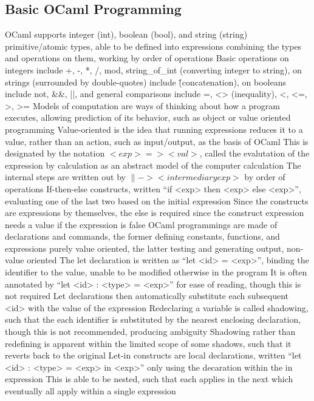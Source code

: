 \documentclass[11 pt, twoside]{article}
\newenvironment{outline*}
{
	\begin{outline}[enumerate]
	}
	{\end{outline}
}
\begin{document}
\subsection{Basic OCaml Programming}
\begin{outline*}
\1 OCaml supports integer (int), boolean (bool), and string (string) primitive/atomic types, able to be defined into expressions combining the types and operations on them, working by order of operations
\2 Basic operations on integers include +, -, *, /, mod, string\_of\_int (converting integer to string), on strings (surrounded by double-quotes) include \^ (concatenation), on booleans include not, \&\&, ||, and general comparisons include =, <> (inequality), <, <=, >, >=
\1 Models of computation are ways of thinking about how a program executes, allowing prediction of its behavior, such as object or value oriented programming
\2 Value-oriented is the idea that running expressions reduces it to a value, rather than an action, such as input/output, as the basis of OCaml
\2 This is designated by the notation $<exp> => <val>$, called the evalutation of the expression by calculation as an abstract model of the computer calculation
\3 The internal steps are written out by $\|-> <intermediary exp>$ by order of operations
\1 If-then-else constructs, written ``if <exp> then <exp> else <exp>'', evaluating one of the last two based on the initial expression
\2 Since the constructs are expressions by themselves, the else is required since the construct expression needs a value if the expression is false
\1 OCaml programmings are made of declarations and commands, the former defining constants, functions, and expressions purely value oriented, the latter testing and generating output, non-value oriented
\2 The let declaration is written as ``let <id> = <exp>'', binding the identifier to the value, unable to be modified otherwise in the program
\3 It is often annotated by ``let <id> : <type> = <exp>'' for ease of reading, though this is not required
\3 Let declarations then automatically substitute each subsequent <id> with the value of the expression
\3 Redeclaring a variable is called shadowing, such that the each identifier is substituted by the nearest enclosing declaration, though this is not recommended, producing ambiguity
\4 Shadowing rather than redefining is apparent within the limited scope of some shadows, such that it reverts back to the original
\2 Let-in constructs are local declarations, written ``let <id> : <type> = <exp> in <exp>'' only using the decaration within the in expression
\3 This is able to be nested, such that each applies in the next which eventually all apply within a single expression

\end{outline*}
\end{document}
